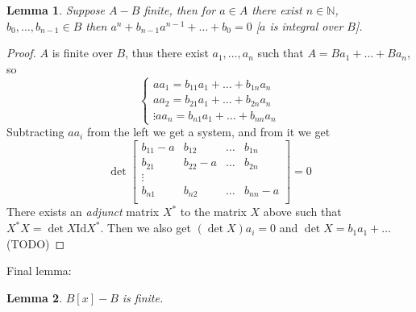 \documentclass[12pt]{article}
\newcommand{\Id}{\mathrm{Id}}
\newtheorem{lemma}{Lemma}[section]
\begin{document}
    \begin{lemma}
        Suppose $A - B$ finite, then for $a \in A$ there exist $n \in \mathbb{N}$, $b_0, \dots, b_{n-1} \in B$ then $a^n + b_{n-1}a^{n-1} + \dots + b_0 = 0$ [$a$ is integral over $B$].
    \end{lemma}
    \begin{proof}
        $A$ is finite over $B$, thus there exist $a_1, \dots, a_n$ such that $A = Ba_1 + \dots + Ba_n$, so
        $$\begin{cases}
            aa_1 = b_{11}a_1 + \dots + b_{1n}a_n \\
            aa_2 = b_{21}a_1 + \dots + b_{2n}a_n \\
            \vdots
            aa_n = b_{n1}a_1 + \dots + b_{nn}a_n
        \end{cases}
        $$
        Subtracting $aa_i$ from the left we get a system, and from it we get
        $$\det \begin{bmatrix}
            b_{11}-a & b_{12} & \dots & b_{1n} \\
            b_{21} & b_{22}-a & \dots & b_{2n} \\
            \vdots \\
            b_{n1} & b_{n2} & \dots & b_{nn}-a \\
        \end{bmatrix} = 0$$
        There exists an \textit{adjunct} matrix $X^*$ to the matrix $X$ above such that $X^*X = \det X \Id X^*$. Then we also get
        $(\det X)a_i = 0$ and $\det X = b_1a_1 + \dots $ (TODO)
    \end{proof}
    Final lemma:
    \begin{lemma}
         $B[x] - B$ is finite.
    \end{lemma}
\end{document}
